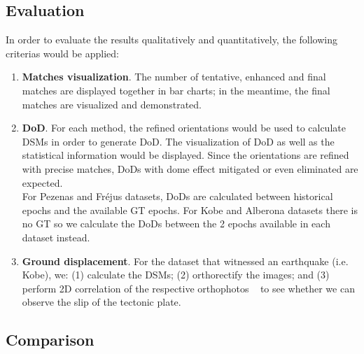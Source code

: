 \subsection{Evaluation}
In order to evaluate the results qualitatively and quantitatively, the following criterias would be applied:\\
\begin{enumerate}
	\item \textbf{Matches visualization}. The number of tentative, enhanced and final matches are displayed together in bar charts; in the meantime, the final matches are visualized and demonstrated.
	\item \textbf{\ac{DoD}}. For each method, the refined orientations would be used to calculate DSMs in order to generate \ac{DoD}. The visualization of \ac{DoD} as well as the statistical information would be displayed. Since the orientations are refined with precise matches, \ac{DoD}s with dome effect mitigated or even eliminated are expected.\\
	For Pezenas and Fr\'ejus datasets, DoDs are calculated between historical epochs and the available \ac{GT} epochs. For Kobe and Alberona datasets there is no \ac{GT} so we calculate the \ac{DoD}s between the 2 epochs available in each dataset instead.\\
	\item \textbf{Ground displacement}. For the dataset that witnessed an earthquake (i.e. Kobe), we: (1) calculate the DSMs; (2) orthorectify the images; and (3) perform 2D correlation of the respective orthophotos ~\cite{rosu2015measurement} to see whether we can observe the slip of the tectonic plate.
\end{enumerate}


\subsection{Comparison}
